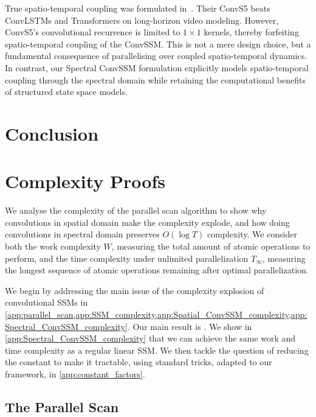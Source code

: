 \documentclass{article}
\begin{document}
True spatio-temporal coupling was formulated in~\citet{smith2023convs5}. Their ConvS5 beats ConvLSTMs and Transformers on long-horizon video modeling. However, ConvS5's convolutional recurrence is limited to $1 \!\times\! 1$ kernels, thereby forfeiting spatio-temporal coupling of the ConvSSM. This is not a mere design choice, but a fundamental consequence of parallelising over coupled spatio-temporal dynamics. In contrast, our Spectral ConvSSM formulation explicitly models spatio-temporal coupling through the spectral domain while retaining the computational benefits of structured state space models.

\section{Conclusion}




\newpage
\appendix

\section{Complexity Proofs}
\label{app:complexity_proofs}

We analyse the complexity of the parallel scan algorithm to show why convolutions in spatial domain make the complexity explode, and how doing convolutions in spectral domain preserves $O(\log T)$ complexity. We consider both the work complexity $W$, measuring the total amount of atomic operations to perform, and the time complexity under unlimited parallelization $T_\infty$, measuring the longest sequence of atomic operations remaining after optimal parallelization.

We begin by addressing the main issue of the complexity explosion of convolutional SSMs in \cref{app:parallel_scan,app:SSM_complexity,app:Spatial_ConvSSM_complexity,app:Spectral_ConvSSM_complexity}. Our main result is . We show in \cref{app:Spectral_ConvSSM_complexity} that we can achieve the same work and time complexity as a regular linear SSM. We then tackle the question of reducing the constant to make it tractable, using standard tricks, adapted to our framework, in \cref{app:constant_factors}.

\subsection{The Parallel Scan}
\label{app:parallel_scan}
\end{document}
